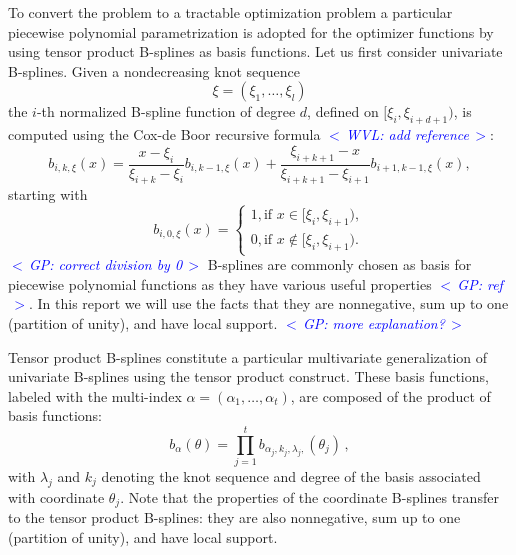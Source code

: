\documentclass{article}
\newcommand{\commentGP}[1]{\noindent \textcolor{blue}{\emph{$<\,$GP: #1$\,>$}}}%
\newcommand{\commentWVL}[1]{\noindent \textcolor{blue}{\emph{$<\,$WVL: #1$\,>$}}}%
\newcommand{\ppar}{\theta}                          %
\begin{document}
To convert the problem to a tractable optimization problem a particular piecewise polynomial parametrization is adopted for the optimizer functions by using tensor product B-splines as basis functions. Let us first consider univariate B-splines. Given a nondecreasing knot sequence
\[
    \xi = (\xi_1, \ldots, \xi_l)
\]
the $i$-th normalized B-spline function of degree $d$, defined on $[\xi_i,
\xi_{i+d+1})$, is computed using the Cox-de Boor recursive formula
\commentWVL{add reference}:
\[
    b_{i,k,\xi}(x) = \frac{x-\xi_i}{\xi_{i+k} - \xi_i}
    b_{i,k-1,\xi}(x) +
    \frac{\xi_{i+k+1}-x}{\xi_{i+k+1} - \xi_{i+1}}
    b_{i+1,k-1,\xi}(x) ,
\]
starting with
\[
    b_{i,0,\xi}(x)  =
    \begin{cases}
        1 , \text{if } x \in [\xi_i , \xi_{i+1} ) , \\
        0, \text{if } x \notin [\xi_i , \xi_{i+1} ) .
    \end{cases}
\]
\commentGP{correct division by 0} B-splines are commonly chosen as basis for piecewise polynomial functions as they have various useful properties \commentGP{ref}. In this report we will use the facts that they are nonnegative, sum up to one (partition of unity), and have local support. \commentGP{more explanation?}

Tensor product B-splines constitute a particular multivariate  generalization of univariate B-splines using the tensor product construct. These basis functions, labeled with the multi-index $\alpha=(\alpha_1, \ldots, \alpha_t)$, are composed of the product of basis functions:
\[ b_\alpha(\ppar) = \prod_{j=1}^t b_{\alpha_j, k_j, \lambda_j,}(\ppar_j) \,,%
\]
with $\lambda_j$ and $k_j$ denoting the knot sequence and degree of the basis associated with coordinate $\ppar_j$. Note that the properties of the coordinate B-splines transfer to the tensor product B-splines: they are also nonnegative, sum up to one (partition of unity), and have local support.
\end{document}
